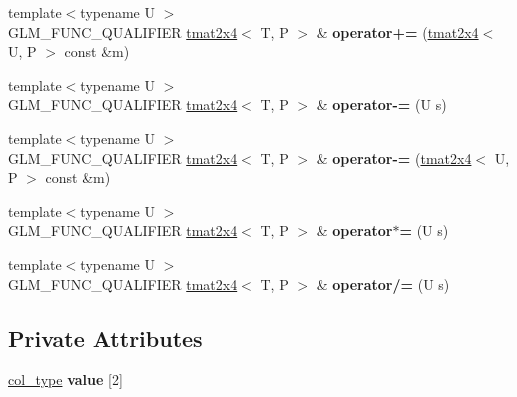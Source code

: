 \begin{DoxyCompactItemize}
\item 
{\footnotesize template$<$typename U $>$ }\\G\+L\+M\+\_\+\+F\+U\+N\+C\+\_\+\+Q\+U\+A\+L\+I\+F\+I\+ER \hyperlink{structglm_1_1detail_1_1tmat2x4}{tmat2x4}$<$ T, P $>$ \& {\bfseries operator+=} (\hyperlink{structglm_1_1detail_1_1tmat2x4}{tmat2x4}$<$ U, P $>$ const \&m)\hypertarget{structglm_1_1detail_1_1tmat2x4_af83887f4894721e8b28d9253fb616700}{}\label{structglm_1_1detail_1_1tmat2x4_af83887f4894721e8b28d9253fb616700}

\item 
{\footnotesize template$<$typename U $>$ }\\G\+L\+M\+\_\+\+F\+U\+N\+C\+\_\+\+Q\+U\+A\+L\+I\+F\+I\+ER \hyperlink{structglm_1_1detail_1_1tmat2x4}{tmat2x4}$<$ T, P $>$ \& {\bfseries operator-\/=} (U s)\hypertarget{structglm_1_1detail_1_1tmat2x4_a0289438555ea967c110a13f4df846953}{}\label{structglm_1_1detail_1_1tmat2x4_a0289438555ea967c110a13f4df846953}

\item 
{\footnotesize template$<$typename U $>$ }\\G\+L\+M\+\_\+\+F\+U\+N\+C\+\_\+\+Q\+U\+A\+L\+I\+F\+I\+ER \hyperlink{structglm_1_1detail_1_1tmat2x4}{tmat2x4}$<$ T, P $>$ \& {\bfseries operator-\/=} (\hyperlink{structglm_1_1detail_1_1tmat2x4}{tmat2x4}$<$ U, P $>$ const \&m)\hypertarget{structglm_1_1detail_1_1tmat2x4_a7f1203e2377c0b0f9e5c1a1bb68006a7}{}\label{structglm_1_1detail_1_1tmat2x4_a7f1203e2377c0b0f9e5c1a1bb68006a7}

\item 
{\footnotesize template$<$typename U $>$ }\\G\+L\+M\+\_\+\+F\+U\+N\+C\+\_\+\+Q\+U\+A\+L\+I\+F\+I\+ER \hyperlink{structglm_1_1detail_1_1tmat2x4}{tmat2x4}$<$ T, P $>$ \& {\bfseries operator$\ast$=} (U s)\hypertarget{structglm_1_1detail_1_1tmat2x4_a3d1fb988d316f24267ca8349b5627be8}{}\label{structglm_1_1detail_1_1tmat2x4_a3d1fb988d316f24267ca8349b5627be8}

\item 
{\footnotesize template$<$typename U $>$ }\\G\+L\+M\+\_\+\+F\+U\+N\+C\+\_\+\+Q\+U\+A\+L\+I\+F\+I\+ER \hyperlink{structglm_1_1detail_1_1tmat2x4}{tmat2x4}$<$ T, P $>$ \& {\bfseries operator/=} (U s)\hypertarget{structglm_1_1detail_1_1tmat2x4_a84f40f6dabc1767c21dd5440f038a363}{}\label{structglm_1_1detail_1_1tmat2x4_a84f40f6dabc1767c21dd5440f038a363}

\end{DoxyCompactItemize}
\subsection*{Private Attributes}
\begin{DoxyCompactItemize}
\item 
\hyperlink{structglm_1_1detail_1_1tvec4}{col\+\_\+type} {\bfseries value} \mbox{[}2\mbox{]}\hypertarget{structglm_1_1detail_1_1tmat2x4_a242beaaeb8667b137519a307eb200fc3}{}\label{structglm_1_1detail_1_1tmat2x4_a242beaaeb8667b137519a307eb200fc3}

\end{DoxyCompactItemize}


